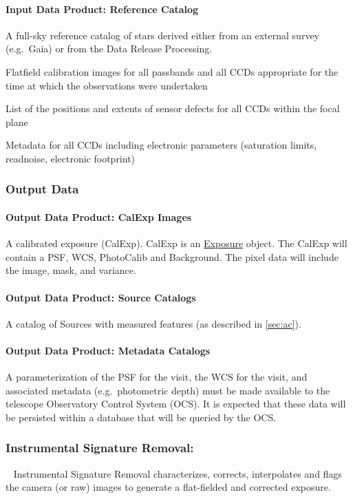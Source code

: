 \paragraph*{Input Data Product: Reference Catalog}

A full-sky reference catalog of stars derived either from an external survey (e.g.\ Gaia) or from the Data Release Processing.

Flatfield calibration images for all passbands and all CCDs appropriate for the time at which the observations were undertaken

List of the positions and extents of sensor defects for all CCDs within the focal plane

Metadata for all CCDs including electronic parameters (saturation limits, readnoise, electronic footprint)

\subsubsection{Output Data}

\paragraph*{Output Data Product: CalExp Images}

A calibrated exposure (CalExp).  CalExp is an \hyperref[sec:spImagesExposure]{Exposure} object. The CalExp will contain a PSF, WCS, PhotoCalib and Background. The pixel data will include the image, mask, and variance. 

\paragraph*{Output Data Product: Source Catalogs}

A catalog of Sources with measured features (as described in \ref{sec:ac}). 


\paragraph*{Output Data Product: Metadata Catalogs}
A parameterization of the PSF for the visit, the WCS for the visit,
and associated metadata (e.g.\ photometric depth) must be made
available to the telescope Observatory Control System (OCS). It is
expected that these data will be persisted within a database that will
be queried by the OCS.




\subsubsection{Instrumental Signature Removal:}~
\label{sec:apISR}
Instrumental Signature Removal characterizes, corrects, interpolates
and flags the camera (or raw) images to generate a flat-fielded and corrected
exposure.


